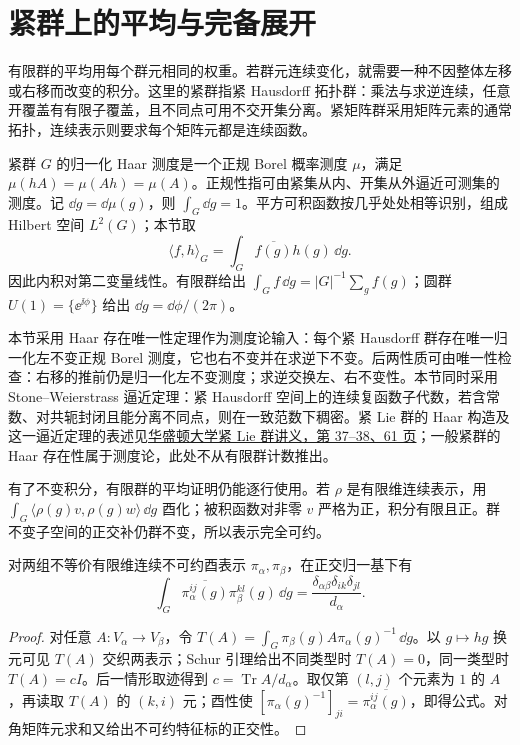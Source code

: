\section{紧群上的平均与完备展开}
有限群的平均用每个群元相同的权重。若群元连续变化，就需要一种不因整体左移或右移而改变的积分。这里的紧群指紧 Hausdorff 拓扑群：乘法与求逆连续，任意开覆盖有有限子覆盖，且不同点可用不交开集分离。紧矩阵群采用矩阵元素的通常拓扑，连续表示则要求每个矩阵元都是连续函数。

\begin{definition}
紧群 $G$ 的归一化 Haar 测度是一个正规 Borel 概率测度 $\mu$，满足 $\mu(hA)=\mu(Ah)=\mu(A)$。正规性指可由紧集从内、开集从外逼近可测集的测度。记 $\dd g=\dd\mu(g)$，则 $\int_G\dd g=1$。平方可积函数按几乎处处相等识别，组成 Hilbert 空间 $L^2(G)$；本节取
\[
\langle f,h\rangle_G=\int_G\overline{f(g)}h(g)\,\dd g.
\]
因此内积对第二变量线性。有限群给出 $\int_G f\,\dd g=|G|^{-1}\sum_gf(g)$；圆群 $U(1)=\{\ee^{\ii\phi}\}$ 给出 $\dd g=\dd\phi/(2\pi)$。
\label{def:compact-haar-normalization}
\end{definition}

本节采用 Haar 存在唯一性定理作为测度论输入：每个紧 Hausdorff 群存在唯一归一化左不变正规 Borel 测度，它也右不变并在求逆下不变。后两性质可由唯一性检查：右移的推前仍是归一化左不变测度；求逆交换左、右不变性。本节同时采用 Stone--Weierstrass 逼近定理：紧 Hausdorff 空间上的连续复函数子代数，若含常数、对共轭封闭且能分离不同点，则在一致范数下稠密。紧 Lie 群的 Haar 构造及这一逼近定理的表述见\href{https://courses.washington.edu/mnotes/liegroups/notes.pdf}{华盛顿大学紧 Lie 群讲义，第 37--38、61 页}；一般紧群的 Haar 存在性属于测度论，此处不从有限群计数推出。

有了不变积分，有限群的平均证明仍能逐行使用。若 $\rho$ 是有限维连续表示，用 $\int_G\langle\rho(g)v,\rho(g)w\rangle\,\dd g$ 酉化；被积函数对非零 $v$ 严格为正，积分有限且正。群不变子空间的正交补仍群不变，所以表示完全可约。

\begin{proposition}[紧群矩阵元的正交关系]
对两组不等价有限维连续不可约酉表示 $\pi_\alpha,\pi_\beta$，在正交归一基下有
\[
\int_G\overline{\pi_\alpha^{ij}(g)}\pi_\beta^{kl}(g)\,\dd g
=\frac{\delta_{\alpha\beta}\delta_{ik}\delta_{jl}}{d_\alpha}.
\label{eq:compact-matrix-orthogonality}
\]
\end{proposition}

\begin{proof}
对任意 $A:V_\alpha\to V_\beta$，令 $T(A)=\int_G\pi_\beta(g)A\pi_\alpha(g)^{-1}\,\dd g$。以 $g\mapsto hg$ 换元可见 $T(A)$ 交织两表示；Schur 引理给出不同类型时 $T(A)=0$，同一类型时 $T(A)=cI$。后一情形取迹得到 $c=\operatorname{Tr}A/d_\alpha$。取仅第 $(l,j)$ 个元素为 $1$ 的 $A$，再读取 $T(A)$ 的 $(k,i)$ 元；酉性使 $[\pi_\alpha(g)^{-1}]_{ji}=\overline{\pi_\alpha^{ij}(g)}$，即得公式。对角矩阵元求和又给出不可约特征标的正交性。
\end{proof}

